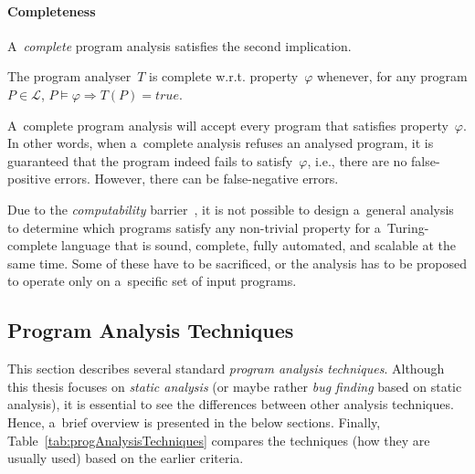 \paragraph{Completeness}
A~\emph{complete} program analysis satisfies the second implication.
\begin{definition}
    The program analyser~$ T $ is complete w.r.t. property~$ \varphi $ whenever, for any program $ P \in \mathcal{L} $, $ P \models \varphi \Longrightarrow T(P) = true $.
\end{definition}
A~complete program analysis will accept every program that satisfies property~$ \varphi $. In other words, when a~complete analysis refuses an analysed program, it is guaranteed that the program indeed fails to satisfy~$ \varphi $, i.e., there are no false-positive errors. However, there can be false-negative errors.

Due to the \emph{computability} barrier~\cite{rice}, it is not possible to design a~general analysis to determine which programs satisfy any non-trivial property for a~Turing-complete language that is sound, complete, fully automated, and scalable at the same time. Some of these have to be sacrificed, or the analysis has to be proposed to operate only on a~specific set of input programs.

\subsection{Program Analysis Techniques}
\label{sec:analysisTechniques}

This section describes several standard \emph{program analysis techniques}. Although this thesis focuses on \emph{static analysis} (or maybe rather \emph{bug finding} based on static analysis), it is essential to see the differences between other analysis techniques. Hence, a~brief overview is presented in the below sections. Finally, Table~\ref{tab:progAnalysisTechniques} compares the techniques (how they are usually used) based on the earlier criteria.

